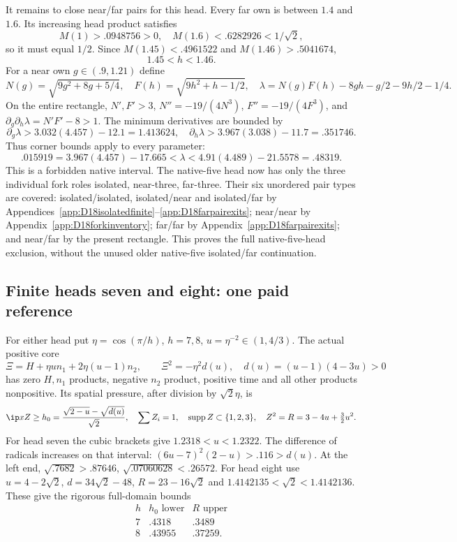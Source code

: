 It remains to close near/far pairs for this head.
Every far own is between \(1.4\) and \(1.6\).
Its increasing head product satisfies
\[
 M(1)>.0948756>0,\quad M(1.6)<.6282926<1/\sqrt2,
\]
so it must equal \(1/2\).
Since \(M(1.45)<.4961522\) and \(M(1.46)>.5041674\),
\[
                              1.45<h<1.46 .
\]
For a near own \(g\in(.9,1.21)\) define
\[
 N(g)=\sqrt{9g^2+8g+5/4},\quad F(h)=\sqrt{9h^2+h-1/2},\quad
 \lambda=N(g)F(h)-8gh-g/2-9h/2-1/4 .
\]
On the entire rectangle,
\(N',F'>3\), \(N''=-19/(4N^3)\),
\(F''=-19/(4F^3)\), and
\(\partial_g\partial_h\lambda=N'F'-8>1\).
The minimum derivatives are bounded by
\[
 \partial_g\lambda>3.032(4.457)-12.1=1.413624,\quad
 \partial_h\lambda>3.967(3.038)-11.7=.351746 .
\]
Thus corner bounds apply to every parameter:
\[
 .015919=3.967(4.457)-17.665
       <\lambda<
 4.91(4.489)-21.5578=.48319 .
\]
This is a forbidden native interval.
The native-five head now has only the three individual fork roles
isolated, near-three, far-three.
Their six unordered pair types are covered:
isolated/isolated, isolated/near and isolated/far by
Appendices~\ref{app:D18isolatedfinite}--\ref{app:D18farpairexits};
near/near by Appendix~\ref{app:D18forkinventory};
far/far by Appendix~\ref{app:D18farpairexits};
and near/far by the present rectangle.
This proves the full native-five-head exclusion, without the
unused older native-five isolated/far continuation.

\subsection{Finite heads seven and eight: one paid reference}
\label{app:D18finite78reference}

For either head put \(\eta=\cos(\pi/h)\), \(h=7,8\),
\(u=\eta^{-2}\in(1,4/3)\).
The actual positive core
\[
 \Xi=H+\eta u n_1+2\eta(u-1)n_2,\qquad
 \Xi^2=-\eta^2d(u),\quad d(u)=(u-1)(4-3u)>0
\]
has zero \(H,n_1\) products, negative \(n_2\) product,
positive time and all other products nonpositive.
Its spatial pressure, after division by \(\sqrt2\eta\), is
\[
 \ip xZ\ge h_0={\sqrt{2-u}-\sqrt{d(u)}\over\sqrt2},\quad
 \sum Z_i=1,\quad
 \operatorname{supp}Z\subset\{1,2,3\},\quad
 Z^2=R=3-4u+\tfrac32u^2 .
\]
For head seven the cubic brackets give
\(1.2318<u<1.2322\).
The difference of radicals increases on that interval:
\((6u-7)^2(2-u)>.116>d(u)\).
At the left end,
\(\sqrt{.7682}>.87646\), \(\sqrt{.07060628}<.26572\).
For head eight use
\(u=4-2\sqrt2\), \(d=34\sqrt2-48\), \(R=23-16\sqrt2\)
and \(1.4142135<\sqrt2<1.4142136\).
These give the rigorous full-domain bounds
\[
 \begin{array}{c|cc}
 h&h_0\text{ lower}&R\text{ upper}\\ \hline
 7&.4318&.3489\\
 8&.43955&.37259 .
 \end{array}
\]

